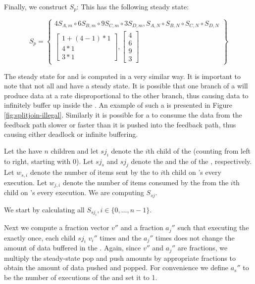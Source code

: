 Finally, we construct $S_p$:
This {\pipeline} has the following steady state:

\begin{displaymath}
S_p = \left\{
\begin{array}{c}
4 S_{A,m} \circ 6 S_{B,m} \circ 9 S_{C,m} \circ 3
S_{D,m}, S_{A,N} \circ S_{B,N} \circ S_{C,N} \circ S_{D,N} \\
\left[
\begin{array}{c}
1 + (4-1) * 1 \\
4 * 1 \\
3 * 1
\end{array}\right],
\left[ \begin{array}{c} 4\\ 6\\ 9\\ 3 \end{array} \right]
\end{array}
\right\}
\end{displaymath}

The steady state for {\splitjoins} and {\feedbackloops} is computed in
a very similar way. It is important to note that not all
{\splitjoins} and {\feedbackloops} have a steady state. It is possible
that one branch of a {\splitjoin} will produce data at a rate
disproportional to the other branch, thus causing data to
infinitely buffer up inside the {\splitjoin}. An example of such a
{\splitjoin} is presented in Figure \ref{fig:splitjoin-illegal}.
Similarly it is possible for a {\feedbackloop} to consume the data
from the feedback path slower or faster than it is pushed into the
feedback path, thus causing either deadlock or infinite buffering.

\subsubsubsection{\splitjoin}

Let the {\splitjoin} have $n$ children and let $sj_i$ denote the
$i$th child of the {\splitjoin} (counting from left to right,
starting with 0).  Let $sj_s$ and $sj_j$ denote the {\splitter}
and the {\joiner} of the {\splitjoin}, respectively. Let $w_{s,i}$
denote the number of items sent by the {\splitter} to $i$th child
on {\splitter}'s every execution. Let $w_{j,i}$ denote the number
of items consumed by the {\joiner} from the $i$th child on
{\joiner}'s every execution.  We are computing $S_{sj}$.

We start by calculating all $S_{sj_i}, i \in \{0, \dots, n-1\}$.

Next we compute a fraction vector $v''$ and a fraction $a_j''$
such that executing the {\splitter} exactly once, each child
$sj_i$ $v_i''$ times and the {\joiner} $a_j''$ times does not
change the amount of data buffered in the {\splitjoin}. Again,
since $v''$ and $a_j''$ are fractions, we multiply the
steady-state pop and push amounts by appropriate fractions to
obtain the amount of data pushed and popped.  For convenience we
define $a_s''$ to be the number of executions of the {\splitter}
and set it to 1.

